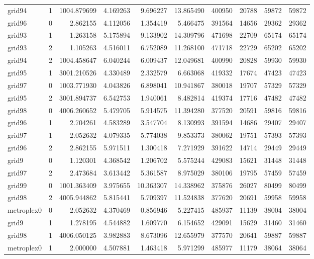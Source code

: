 \begin{longtable}{|l|r|r|r|r|r|r|r|r|r|}
grid94 & 1 & 1004.879699 & 4.169263 & 9.696227 & 13.865490 & 400950 & 20788 & 59872 & 59872 \\
grid96 & 0 & 2.862155 & 4.112056 & 1.354419 & 5.466475 & 391564 & 14656 & 29362 & 29362 \\
grid93 & 1 & 1.263158 & 5.175894 & 9.133902 & 14.309796 & 471698 & 22709 & 65174 & 65174 \\
grid93 & 2 & 1.105263 & 4.516011 & 6.752089 & 11.268100 & 471718 & 22729 & 65202 & 65202 \\
grid94 & 2 & 1004.458647 & 6.040244 & 6.009437 & 12.049681 & 400990 & 20828 & 59930 & 59930 \\
grid95 & 1 & 3001.210526 & 4.330489 & 2.332579 & 6.663068 & 419332 & 17674 & 47423 & 47423 \\
grid97 & 0 & 1003.771930 & 4.043826 & 6.898041 & 10.941867 & 380018 & 19707 & 57329 & 57329 \\
grid95 & 2 & 3001.894737 & 6.542753 & 1.940061 & 8.482814 & 419374 & 17716 & 47482 & 47482 \\
grid98 & 0 & 4006.260652 & 5.479705 & 5.914575 & 11.394280 & 377520 & 20591 & 59816 & 59816 \\
grid96 & 1 & 2.704261 & 4.583289 & 3.547704 & 8.130993 & 391594 & 14686 & 29407 & 29407 \\
grid97 & 1 & 2.052632 & 4.079335 & 5.774038 & 9.853373 & 380062 & 19751 & 57393 & 57393 \\
grid96 & 2 & 2.862155 & 5.971511 & 1.300418 & 7.271929 & 391622 & 14714 & 29449 & 29449 \\
grid9 & 0 & 1.120301 & 4.368542 & 1.206702 & 5.575244 & 429083 & 15621 & 31448 & 31448 \\
grid97 & 2 & 2.473684 & 3.613442 & 5.361587 & 8.975029 & 380106 & 19795 & 57459 & 57459 \\
grid99 & 0 & 1001.363409 & 3.975655 & 10.363307 & 14.338962 & 375876 & 26027 & 80499 & 80499 \\
grid98 & 2 & 4005.944862 & 5.815441 & 5.709397 & 11.524838 & 377620 & 20691 & 59958 & 59958 \\
metroplex0 & 0 & 2.052632 & 4.370469 & 0.856946 & 5.227415 & 485937 & 11139 & 38004 & 38004 \\
grid9 & 1 & 1.278195 & 4.544882 & 1.609770 & 6.154652 & 429091 & 15629 & 31460 & 31460 \\
grid98 & 1 & 4006.050125 & 3.982883 & 8.673096 & 12.655979 & 377570 & 20641 & 59887 & 59887 \\
metroplex0 & 1 & 2.000000 & 4.507881 & 1.463418 & 5.971299 & 485977 & 11179 & 38064 & 38064 \\

\end{longtable}
